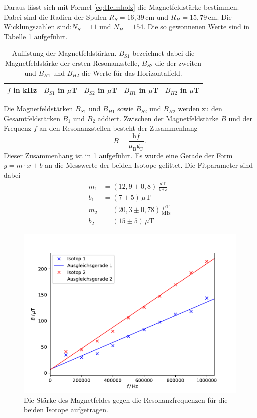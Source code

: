 Daraus lässt sich mit Formel \ref{eq:Helmholz} die Magnetfeldstärke bestimmen.
Dabei sind die Radien der Spulen $R_{S}=16,39$\,cm und $R_H=15,79$\,cm.
Die Wicklungszahlen sind:$N_{S}=11$ und $N_H=154$. Die
so gewonnenen Werte sind in Tabelle \ref{tab:Magnetwerte} aufgeführt.
\begin{table}[H]
    \centering
    \caption{Auflistung der Magnetfeldstärken. $B_{S1}$ bezeichnet dabei die Magnetfeldstärke der
    ersten Resonanzstelle, $B_{S2}$ die der zweiten und $B_{H1}$ und $B_{H2}$ die Werte für das Horizontalfeld.}
    \label{tab:Magnetwerte}
    \begin{tabular}{c|c|c|c|c}
        \toprule
        $f$ in kHz & $B_{S1}$ in $\mu$T & $B_{S2}$ in $\mu$T& $B_{H1}$ in $\mu$T& $B_{H2}$ in $\mu$T\\
        \midrule
        
        \bottomrule
    \end{tabular}
\end{table}
Die Magnetfeldstärken $B_{S1}$ und $B_{H1}$ sowie $B_{S2}$ und $B_{H2}$ werden zu den Gesamtfeldstärken
$B_1$ und $B_2$ addiert.
Zwischen der Magnetfeldstärke $B$ und der Frequenz $f$ an den Resonanzstellen besteht der Zusammenhang
\begin{equation}
  B=\frac{\text{h}f}{\mu_{\text{B}} \text{g}_{\text{F}}} .
\end{equation}
Dieser Zusammenhang ist in \ref{fig:BFelder} aufgeführt. Es wurde eine Gerade der
Form $y=m\cdot x+b$ an die Messwerte der beiden Isotope gefittet. Die Fitparameter sind dabei
\begin{align*}
  m_1&=(12,9 \pm 0,8)\,\frac{\mu\text{T}}{\text{kHz}} \\
  b_1&=(7 \pm 5)\,\mu\text{T}\\
  m_2&=(20,3 \pm 0,78)\,\frac{\mu\text{T}}{\text{kHz}} \\
  b_2&=(15 \pm 5)\,\mu\text{T}
\end{align*}
\begin{figure}
  \centering
  \includegraphics{plots/neuBFelder.pdf}
  \caption{Die Stärke des Magnetfeldes gegen die Resonanzfrequenzen für die beiden Isotope
  aufgetragen.}
  \label{fig:BFelder}
\end{figure}
